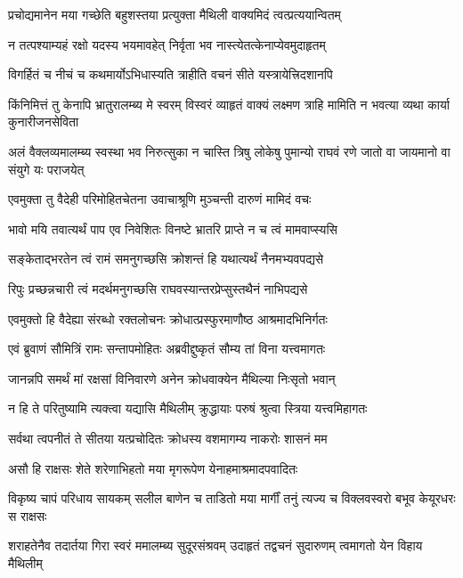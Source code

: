 \twolineshloka
{प्रचोद्यमानेन मया गच्छेति बहुशस्तया}
{प्रत्युक्ता मैथिली वाक्यमिदं त्वत्प्रत्ययान्वितम्} %

\twolineshloka
{न तत्पश्याम्यहं रक्षो यदस्य भयमावहेत्}
{निर्वृता भव नास्त्येतत्केनाप्येवमुदाहृतम्} %

\twolineshloka
{विगर्हितं च नीचं च कथमार्योऽभिधास्यति}
{त्राहीति वचनं सीते यस्त्रायेत्त्रिदशानपि} %

\threelineshloka
{किंनिमित्तं तु केनापि भ्रातुरालम्ब्य मे स्वरम्}
{विस्वरं व्याहृतं वाक्यं लक्ष्मण त्राहि मामिति}
{न भवत्या व्यथा कार्या कुनारीजनसेविता} %

\threelineshloka
{अलं वैक्लव्यमालम्ब्य स्वस्था भव निरुत्सुका}
{न चास्ति त्रिषु लोकेषु पुमान्यो राघवं रणे}
{जातो वा जायमानो वा संयुगे यः पराजयेत्} %

\twolineshloka
{एवमुक्ता तु वैदेही परिमोहितचेतना}
{उवाचाश्रूणि मुञ्चन्ती दारुणं मामिदं वचः} %

\twolineshloka
{भावो मयि तवात्यर्थं पाप एव निवेशितः}
{विनष्टे भ्रातरि प्राप्ते न च त्वं मामवाप्स्यसि} %

\twolineshloka
{सङ्केताद्भरतेन त्वं रामं समनुगच्छसि}
{क्रोशन्तं हि यथात्यर्थं नैनमभ्यवपद्यसे} %

\twolineshloka
{रिपुः प्रच्छन्नचारी त्वं मदर्थमनुगच्छसि}
{राघवस्यान्तरप्रेप्सुस्तथैनं नाभिपद्यसे} %

\twolineshloka
{एवमुक्तो हि वैदेह्या संरब्धो रक्तलोचनः}
{क्रोधात्प्रस्फुरमाणौष्ठ आश्रमादभिनिर्गतः} %

\twolineshloka
{एवं ब्रुवाणं सौमित्रिं रामः सन्तापमोहितः}
{अब्रवीद्दुष्कृतं सौम्य तां विना यत्त्वमागतः} %

\twolineshloka
{जानन्नपि समर्थं मां रक्षसां विनिवारणे}
{अनेन क्रोधवाक्येन मैथिल्या निःसृतो भवान्} %

\twolineshloka
{न हि ते परितुष्यामि त्यक्त्वा यद्यासि मैथिलीम्}
{क्रुद्धायाः परुषं श्रुत्वा स्त्रिया यत्त्वमिहागतः} %

\twolineshloka
{सर्वथा त्वपनीतं ते सीतया यत्प्रचोदितः}
{क्रोधस्य वशमागम्य नाकरोः शासनं मम} %

\twolineshloka
{असौ हि राक्षसः शेते शरेणाभिहतो मया}
{मृगरूपेण येनाहमाश्रमादपवादितः} %

\fourlineindentedshloka
{विकृष्य चापं परिधाय सायकम्}
{सलील बाणेन च ताडितो मया}
{मार्गीं तनुं त्यज्य च विक्लवस्वरो}
{बभूव केयूरधरः स राक्षसः} %

\fourlineindentedshloka
{शराहतेनैव तदार्तया गिरा}
{स्वरं ममालम्ब्य सुदूरसंश्रवम्}
{उदाहृतं तद्वचनं सुदारुणम्}
{त्वमागतो येन विहाय मैथिलीम्} %


